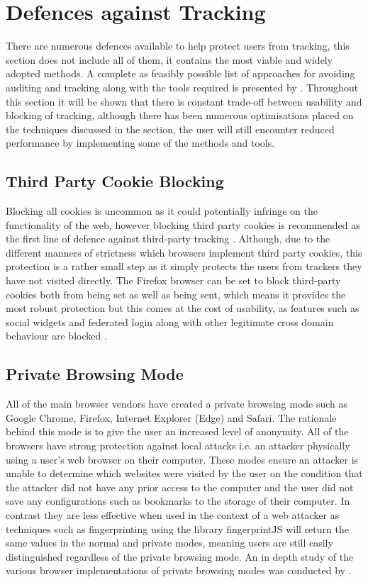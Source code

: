 \documentclass[12pt]{article}
\begin{document}
\section{Defences against Tracking}
There are numerous defences available to help protect users from tracking, this section does not include all of them, it contains the most viable and widely adopted methods. A complete as feasibly possible list of approaches for avoiding  auditing and tracking along with the tools required is presented by \parencite{bujlow2015web}. Throughout this section it will be shown that there is constant trade-off between usability and blocking of tracking, although there has been numerous optimisations placed on the techniques discussed in the section, the user will still encounter reduced performance by implementing some of the methods and tools.   

\subsection{Third Party Cookie Blocking}
Blocking all cookies is uncommon as it could potentially infringe on the functionality of the web, however blocking third party cookies is recommended as the first line of defence against third-party tracking \parencite{roesner}. Although, due to the different manners of strictness which browsers implement third party cookies, this protection is a rather small step as it simply protects the users from trackers they have not visited directly. The Firefox browser can be set to block third-party cookies both from being set as well as being sent, which means it provides the most robust protection but this comes at the cost of usability, as features such as social widgets and federated login along with other legitimate cross domain behaviour are blocked \parencite{roesner}.

\subsection{Private Browsing Mode}
All of the main browser vendors have created a private browsing mode such as Google Chrome, Firefox, Internet Explorer (Edge) and Safari. The rationale behind this mode is to give the user an increased level of anonymity. All of the browsers have strong protection against local attacks i.e. an attacker physically using a user's web browser on their computer. These modes ensure an attacker is unable to determine which websites were visited by the user on the condition that the attacker did not have any prior access to the computer and the user did not save any configurations such as bookmarks to the storage of their computer. In contrast they are less effective when used in the context of a web attacker as techniques such as fingerprinting using the library fingerprintJS will return the same values in the normal and private modes, meaning users are still easily distinguished regardless of the private browsing mode. An in depth study of the various browser implementations of private browsing modes was conducted by \parencite{bursztein2010analysis}.    
\end{document}
